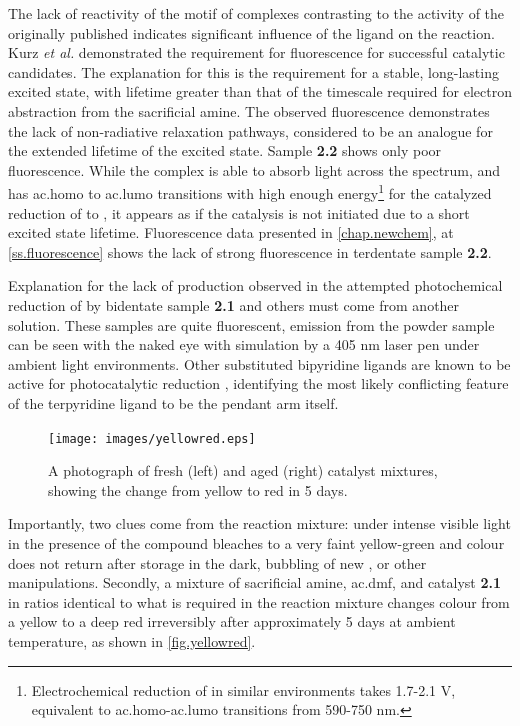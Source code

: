 The lack of reactivity of the  motif of complexes contrasting to the activity of the originally published  indicates significant influence of the ligand on the reaction. Kurz \textit{et al.} demonstrated the requirement for fluorescence for successful catalytic candidates\autocite{kurz2006}. The explanation for this is the requirement for a stable, long-lasting excited state, with lifetime greater than that of the timescale required for electron abstraction from the sacrificial amine. The observed fluorescence demonstrates the lack of non-radiative relaxation pathways, considered to be an analogue for the extended lifetime of the excited state. Sample \textbf{2.2} shows only poor fluorescence. While the complex is able to absorb light across the spectrum, and has \gls{ac.homo} to \gls{ac.lumo} transitions with high enough energy\footnote{Electrochemical reduction of  in similar environments takes 1.7-2.1 V, equivalent to \gls{ac.homo}-\gls{ac.lumo} transitions from 590-750 nm\autocite{grills2014}.} for the catalyzed reduction of  to , it appears as if the catalysis is not initiated due to a short excited state lifetime. Fluorescence data presented in \autoref{chap.newchem}, at \autoref{ss.fluorescence} shows the lack of strong fluorescence in terdentate sample \textbf{2.2}.

Explanation for the lack of  production observed in the attempted photochemical reduction of  by bidentate sample \textbf{2.1} and others must come from another solution. These samples are quite fluorescent, emission from the powder sample can be seen with the naked eye with simulation by a 405 nm laser pen under ambient light environments.  Other substituted bipyridine ligands are known to be active for photocatalytic reduction \autocite{hawecker1986, kurz2006}, identifying the most likely conflicting feature of the terpyridine ligand to be the pendant arm itself.

\begin{figure}[!htbp]
 \begin{center}
  \texttt{[image: images/yellowred.eps]}
 \end{center}
 \caption[A photograph of aged and fresh catalytic mixture.]{A photograph of fresh (left) and aged (right) catalyst mixtures, showing the change from yellow to red in 5 days.}
 \label{fig.yellowred}
\end{figure}

Importantly, two clues come from the reaction mixture: under intense visible light in the presence of  the compound bleaches to a very faint yellow-green and colour does not return after storage in the dark, bubbling of new , or other manipulations. Secondly, a mixture of sacrificial amine, \gls{ac.dmf}, and catalyst \textbf{2.1} in ratios identical to what is required in the reaction mixture changes colour from a yellow to a deep red irreversibly after approximately 5 days at ambient temperature, as shown in \autoref{fig.yellowred}. 

